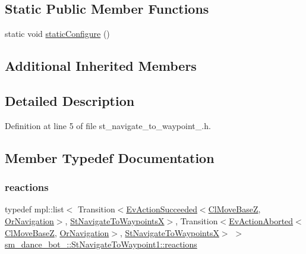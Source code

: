 \subsection*{Static Public Member Functions}
\begin{DoxyCompactItemize}
\item 
static void \hyperlink{structsm__dance__bot__2_1_1StNavigateToWaypoint1_a5461cc9743f6f36ab01092d59e65c75d}{static\+Configure} ()
\end{DoxyCompactItemize}
\subsection*{Additional Inherited Members}


\subsection{Detailed Description}


Definition at line 5 of file st\+\_\+navigate\+\_\+to\+\_\+waypoint\+\_.\+h.



\subsection{Member Typedef Documentation}
\mbox{\label{structsm__dance__bot__2_1_1StNavigateToWaypoint1_aff49378c737221ccf57ba31064bd15a2}} 
\subsubsection{\texorpdfstring{reactions}{reactions}}
{\footnotesize\ttfamily typedef mpl\+::list$<$ Transition$<$\hyperlink{structsmacc_1_1default__events_1_1EvActionSucceeded}{Ev\+Action\+Succeeded}$<$\hyperlink{classcl__move__base__z_1_1ClMoveBaseZ}{Cl\+Move\+BaseZ}, \hyperlink{classsm__dance__bot__2_1_1OrNavigation}{Or\+Navigation}$>$, \hyperlink{structsm__dance__bot__2_1_1StNavigateToWaypointsX}{St\+Navigate\+To\+WaypointsX}$>$, Transition$<$\hyperlink{structsmacc_1_1default__events_1_1EvActionAborted}{Ev\+Action\+Aborted}$<$\hyperlink{classcl__move__base__z_1_1ClMoveBaseZ}{Cl\+Move\+BaseZ}, \hyperlink{classsm__dance__bot__2_1_1OrNavigation}{Or\+Navigation}$>$, \hyperlink{structsm__dance__bot__2_1_1StNavigateToWaypointsX}{St\+Navigate\+To\+WaypointsX}$>$ $>$ \hyperlink{structsm__dance__bot__2_1_1StNavigateToWaypoint1_aff49378c737221ccf57ba31064bd15a2}{sm\+\_\+dance\+\_\+bot\+\_\+::\+St\+Navigate\+To\+Waypoint1\+::reactions}}



